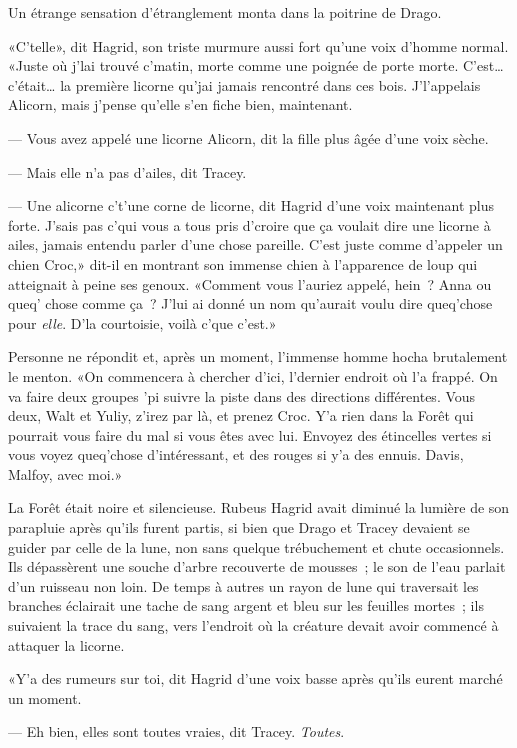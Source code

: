 Un étrange sensation d'étranglement monta dans la poitrine de Drago.

«C'telle», dit Hagrid, son triste murmure aussi fort qu'une voix d'homme normal. «Juste où j'lai trouvé c'matin, morte comme une poignée de porte morte. C'est… c'était… la première licorne qu'jai jamais rencontré dans ces bois. J'l'appelais Alicorn, mais j'pense qu'elle s'en fiche bien, maintenant.

--- Vous avez appelé une licorne Alicorn, dit la fille plus âgée d'une voix sèche.

--- Mais elle n'a pas d'ailes, dit Tracey.

--- Une alicorne c't'une corne de licorne, dit Hagrid d'une voix maintenant plus forte. J'sais pas c'qui vous a tous pris d'croire que ça voulait dire une licorne à ailes, jamais entendu parler d'une chose pareille. C'est juste comme d'appeler un chien Croc,» dit-il en montrant son immense chien à l'apparence de loup qui atteignait à peine ses genoux. «Comment vous l'auriez appelé, hein~? Anna ou queq' chose comme ça~? J'lui ai donné un nom qu'aurait voulu dire queq'chose pour \emph{elle}. D'la courtoisie, voilà c'que c'est.»

Personne ne répondit et, après un moment, l'immense homme hocha brutalement le menton. «On commencera à chercher d'ici, l'dernier endroit où l'a frappé. On va faire deux groupes 'pi suivre la piste dans des directions différentes. Vous deux, Walt et Yuliy, z'irez par là, et prenez Croc. Y'a rien dans la Forêt qui pourrait vous faire du mal si vous êtes avec lui. Envoyez des étincelles vertes si vous voyez queq'chose d'intéressant, et des rouges si y'a des ennuis. Davis, Malfoy, avec moi.»

La Forêt était noire et silencieuse. Rubeus Hagrid avait diminué la lumière de son parapluie après qu'ils furent partis, si bien que Drago et Tracey devaient se guider par celle de la lune, non sans quelque trébuchement et chute occasionnels. Ils dépassèrent une souche d'arbre recouverte de mousses~; le son de l'eau parlait d'un ruisseau non loin. De temps à autres un rayon de lune qui traversait les branches éclairait une tache de sang argent et bleu sur les feuilles mortes~; ils suivaient la trace du sang, vers l'endroit où la créature devait avoir commencé à attaquer la licorne.

«Y'a des rumeurs sur toi, dit Hagrid d'une voix basse après qu'ils eurent marché un moment.

--- Eh bien, elles sont toutes vraies, dit Tracey. \emph{Toutes}.

